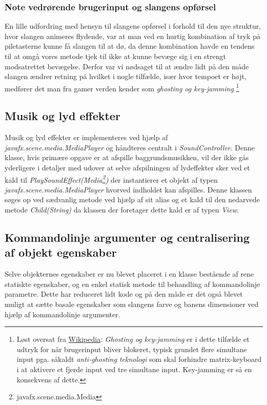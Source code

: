 \documentclass[]{article}
\begin{document}
	\subsubsection{Note vedrørende brugerinput og slangens opførsel}
	
	En lille udfordring med hensyn til slangens opførsel i forhold til den nye struktur, hvor slangen animeres flydende, var at man ved en hurtig kombination af tryk på piletasterne kunne få slangen til at dø, da denne kombination havde en tendens til at omgå vores metode tjek til ikke at kunne bevæge sig i en strengt modsatrettet bevægelse. Derfor var vi nødsaget til at ændre lidt på den måde slangen ændrer retning på hvilket i nogle tilfælde, især hvor tempoet er højt, medfører det man fra gamer verden kender som \textit{ghosting og key-jamming} \footnote{Løst oversat fra \href{https://en.wikipedia.org/wiki/Rollover_(key)}{Wikipedia}: \textit{Ghosting og key-jamming} er i dette tilfælde et udtryk for når brugerinput bliver blokeret, typisk grundet flere simultane input pga. såkaldt \textit{anti-ghosting teknologi} som skal forhindre matrix-keyboard i at aktivere et fjerde input ved tre simultane input. Key-jamming er så en konsekvens af dette.}
	
	\subsection{Musik og lyd effekter}
	
	Musik og lyd effekter er implementeres ved hjælp af \textit{javafx.scene.media.MediaPlayer} og håndteres centralt i \textit{SoundController}. Denne klasse, hvis primære opgave er at afspille baggrundsmusikken, vil der ikke gås yderligere i detaljer med udover at selve afspilningen af lydeffekter sker ved et kald til \textit{PlaySoundEffect(Media\footnote{javafx.scene.media.Media})} der instantierer et objekt af typen \textit{javafx.scene.media.MediaPlayer} hvorved indholdet kan afspilles. Denne klassen søges op ved sædvanlig metode ved hjælp af sit alias og et kald til den nedarvede metode \textit{Child(String)} da klassen der foretager dette kald er af typen \textit{View}.
	
	\subsection{Kommandolinje argumenter og centralisering af objekt egenskaber}
	
	Selve objekternes egenskaber er nu blevet placeret i en klasse bestående af rene statiskte egenskaber, og en enkel statisk metode til behandling af kommandolinje parametre. Dette har reduceret lidt kode og på den måde er det også blevet muligt at sætte basale egenskaber som slangens farve og banens dimensioner ved hjælp af kommandolinje argumenter.  
	
\end{document}
